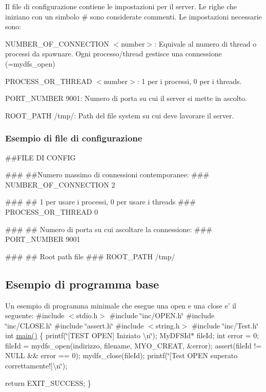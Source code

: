 Il file di configurazione contiene le impostazioni per il server. Le righe che iniziano con un simbolo {\ttfamily \#} sono considerate commenti. Le impostazioni necessarie sono\+:


\begin{DoxyItemize}
\item {\ttfamily N\+U\+M\+B\+E\+R\+\_\+\+O\+F\+\_\+\+C\+O\+N\+N\+E\+C\+T\+I\+O\+N $<$number$>$}\+: Equivale al numero di thread o processi da spawnare. Ogni processo/thread gestisce una connessione (=mydfs\+\_\+open)
\item {\ttfamily P\+R\+O\+C\+E\+S\+S\+\_\+\+O\+R\+\_\+\+T\+H\+R\+E\+A\+D $<$number$>$}\+: 1 per i processi, 0 per i threads.
\item {\ttfamily P\+O\+R\+T\+\_\+\+N\+U\+M\+B\+E\+R 9001}\+: Numero di porta su cui il server si mette in ascolto.
\item {\ttfamily R\+O\+O\+T\+\_\+\+P\+A\+T\+H /tmp/}\+: Path del file system su cui deve lavorare il server.
\end{DoxyItemize}

\subsubsection*{Esempio di file di configurazione}

\begin{DoxyVerb}##FILE DI CONFIG

###
##Numero massimo di connessioni contemporanee:
###
NUMBER_OF_CONNECTION 2

###
## 1 per usare i processi, 0 per usare i threads
###
PROCESS_OR_THREAD 0

###
## Numero di porta su cui ascoltare la connessione:
###
PORT_NUMBER 9001

###
## Root path file
###
ROOT_PATH /tmp/
\end{DoxyVerb}


\subsection*{Esempio di programma base}

Un esempio di programma minimale che esegue una open e una close e' il seguente\+: \#include $<$stdio.\+h$>$ \#include \char`\"{}inc/\+O\+P\+E\+N.\+h\char`\"{} \#include \char`\"{}inc/\+C\+L\+O\+S\+E.\+h\char`\"{} \#include \char`\"{}assert.\+h\char`\"{} \#include $<$string.\+h$>$ \#include \char`\"{}inc/\+Test.\+h\char`\"{} int \hyperlink{testBinario_8c_ae66f6b31b5ad750f1fe042a706a4e3d4}{main()} \{ printf(\char`\"{}\mbox{[}\+T\+E\+S\+T O\+P\+E\+N\mbox{]} Iniziato \textbackslash{}n\char`\"{}); My\+D\+F\+S\+Id$\ast$ file\+Id; int error = 0; file\+Id = mydfs\+\_\+open(indirizzo, filename, M\+Y\+O\+\_\+\+C\+R\+E\+A\+T, \&error); assert(file\+Id != N\+U\+L\+L \&\& error == 0); mydfs\+\_\+close(file\+Id); printf(\char`\"{}\mbox{[}\+Test O\+P\+E\+N superato correttamente!\mbox{]}\textbackslash{}n\char`\"{});

return E\+X\+I\+T\+\_\+\+S\+U\+C\+C\+E\+S\+S; \} 